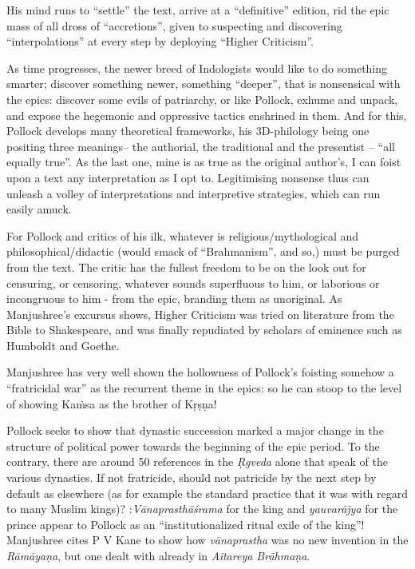 His mind runs to “settle” the text, arrive at a “definitive” edition, rid the epic mass of all dross of  “accretions”, given to suspecting and discovering “interpolations” at every step by deploying “Higher Criticism”.

As time progresses, the newer breed of Indologists would like to do something smarter; discover something newer, something “deeper”, that is nonsensical with the epics: discover some evils of patriarchy, or like Pollock, exhume and unpack, and expose the hegemonic and oppressive tactics enshrined in them. And for this, Pollock develops many theoretical frameworks, his 3D-philology being one positing three meanings-- the authorial, the traditional and the presentist -- “all equally true”. As the last one, mine is as true as the original author's, I can foist upon a text any interpretation as I opt to. Legitimising nonsense thus can unleash a volley of interpretations and interpretive strategies, which can run easily amuck.

For Pollock and critics of his ilk, whatever is religious/mythological and philosophical/didactic (would smack of “Brahmanism”, and so,) must be purged from the text. The critic has the fullest freedom to be on the look out for censuring, or censoring, whatever sounds superfluous to him, or laborious or incongruous to him - from the epic, branding them as unoriginal. As Manjushree's excursus shows, Higher Criticism was tried on literature from the Bible to Shakespeare, and was finally repudiated by scholars of eminence such as Humboldt and Goethe.

Manjushree has very well shown the hollowness of Pollock's foisting somehow a “fratricidal war” as the recurrent theme in the epics: so he can stoop to the level of showing Kaṁsa as the brother of Kṛṣṇa!

Pollock seeks to show that dynastic succession marked a major change in the structure of political power towards the beginning of the epic period. To the contrary, there are around 50 references in the {\sl Ṛgveda} alone that speak of the various dynasties. If not fratricide, should not patricide by the next step by default as elsewhere (as for example the standard practice that it was with regard to many Muslim kings)? :{\sl Vānaprasthāśrama} for the king and {\sl yauvarājya} for the prince appear to Pollock as an “institutionalized ritual exile of the king”! Manjushree cites P V Kane to show how {\sl vānaprastha} was no new invention in the {\sl Rāmāyaṇa}, but one dealt with already in {\sl Aitareya Brāhmaṇa}.

